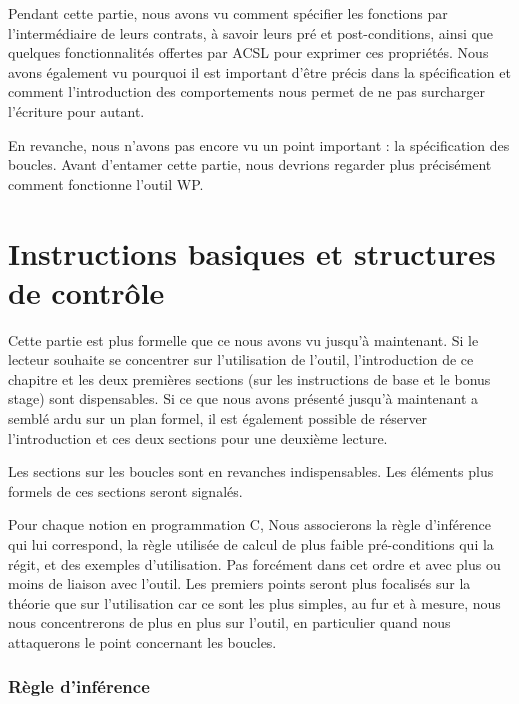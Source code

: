 \documentclass[12pt,francais,]{scrbook}
\newenvironment{zdsblock}[1]{%
  \tcolorbox[beamer,%
    noparskip,breakable,
    colback=LightBlue,colframe=DarkBlue,%
    colbacklower=DarkBlue,%
    title=#1]
}{\endtcolorbox}
\begin{document}
Pendant cette partie, nous avons vu comment spécifier les fonctions par
l'intermédiaire de leurs contrats, à savoir leurs pré et
post-conditions, ainsi que quelques fonctionnalités offertes par ACSL
pour exprimer ces propriétés. Nous avons également vu pourquoi il est
important d'être précis dans la spécification et comment l'introduction
des comportements nous permet de ne pas surcharger l'écriture pour
autant.

En revanche, nous n'avons pas encore vu un point important : la
spécification des boucles. Avant d'entamer cette partie, nous devrions
regarder plus précisément comment fonctionne l'outil WP.

\chapter{Instructions basiques et structures de
contrôle}\label{instructions-basiques-et-structures-de-contruxf4le}

\begin{zdsblock}{Information}
  Cette partie est plus formelle que ce
  nous avons vu jusqu'à maintenant. Si le lecteur souhaite se
  concentrer sur l'utilisation de l'outil, l'introduction de ce
  chapitre et les deux premières sections (sur les instructions de base et
  \og{}le bonus stage\fg{}) sont dispensables. Si ce que nous avons
  présenté jusqu'à maintenant a semblé ardu sur un plan
  formel, il est également possible de réserver l'introduction
  et ces deux sections pour une deuxième lecture.
  
  Les sections sur les boucles sont en revanches indispensables. Les
  éléments plus formels de ces sections seront signalés.
\end{zdsblock}

Pour chaque notion en programmation C, Nous associerons la règle
d'inférence qui lui correspond, la règle utilisée de calcul de plus
faible pré-conditions qui la régit, et des exemples d'utilisation. Pas
forcément dans cet ordre et avec plus ou moins de liaison avec l'outil.
Les premiers points seront plus focalisés sur la théorie que sur
l'utilisation car ce sont les plus simples, au fur et à mesure, nous
nous concentrerons de plus en plus sur l'outil, en particulier quand
nous attaquerons le point concernant les boucles.

\subsection{Règle d'inférence}\label{ruxe8gle-dinfuxe9rence}
\end{document}
